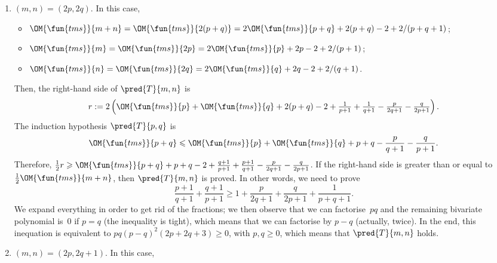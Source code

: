 \begin{enumerate}

  \item \((m,n) = (2p,2q)\). In this case,
    \begin{itemize}

      \item \(\OM{\fun{tms}}{m+n} = \OM{\fun{tms}}{2(p+q)} =
        2\OM{\fun{tms}}{p+q} + 2(p+q) - 2 + 2/(p+q+1)\);

      \item \(\OM{\fun{tms}}{m} = \OM{\fun{tms}}{2p} =
        2\OM{\fun{tms}}{p} + 2p - 2 + 2/(p+1)\);

      \item \(\OM{\fun{tms}}{n} = \OM{\fun{tms}}{2q} =
        2\OM{\fun{tms}}{q} + 2q - 2 + 2/(q+1)\).

    \end{itemize}
    Then, the right\hyp{}hand side of \(\pred{T}{m,n}\) is
    \begin{equation*}
      r := 2\left(\OM{\fun{tms}}{p} + \OM{\fun{tms}}{q} + 2(p+q) - 2 +
        \tfrac{1}{p+1} + \tfrac{1}{q+1} - \tfrac{p}{2q+1} -
        \tfrac{q}{2p+1}\right).
    \end{equation*}
    The induction hypothesis \(\pred{T}{p,q}\) is
    \begin{equation*}
      \OM{\fun{tms}}{p+q} \leqslant \OM{\fun{tms}}{p} +
      \OM{\fun{tms}}{q} + p + q - \frac{p}{q+1} - \frac{q}{p+1}.
    \end{equation*}
    Therefore, \(\tfrac{1}{2}r \geqslant \OM{\fun{tms}}{p+q} + p + q -
    2 + \tfrac{q+1}{p+1} + \tfrac{p+1}{q+1} - \tfrac{p}{2q+1} -
    \tfrac{q}{2p+1}\). If the right\hyp{}hand side is greater than or
    equal to \(\tfrac{1}{2}\OM{\fun{tms}}{m+n}\), then
    \(\pred{T}{m,n}\) is proved. In other words, we need to prove
    \begin{equation*}
      \frac{p+1}{q+1} + \frac{q+1}{p+1} \geqslant 1 +
      \frac{p}{2q+1} + \frac{q}{2p+1} + \frac{1}{p+q+1}.
    \end{equation*}
    We expand everything in order to get rid of the fractions; we then
    observe that we can factorise~\(pq\) and the remaining bivariate
    polynomial is~\(0\) if \(p=q\) (the inequality is tight), which
    means that we can factorise by \(p-q\) (actually, twice). In the
    end, this inequation is equivalent to \(pq(p-q)^2(2p+2q+3)
    \geqslant 0\), with \(p,q \geqslant 0\), which means that
    \(\pred{T}{m,n}\) holds.

  \item \((m,n) = (2p,2q+1)\). In this case,
    \begin{itemize}


\end{itemize}
\end{enumerate}
